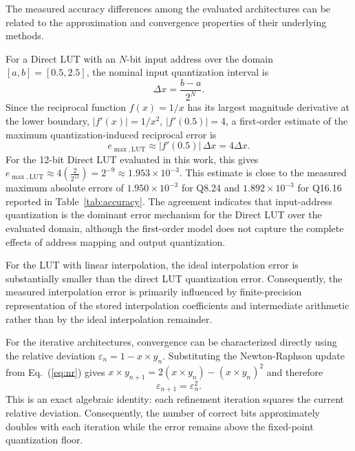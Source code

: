 \documentclass[manuscript,screen,review]{acmart}
\begin{document}
The measured accuracy differences among the evaluated architectures can be related to the approximation and convergence properties of their underlying methods.

For a Direct LUT with an $N$-bit input address over the domain $[a,b] = [0.5, 2.5]$, the nominal input quantization interval is
\begin{equation}
\Delta x = \frac{b - a}{2^N}.
\label{eq:deltax}
\end{equation}
Since the reciprocal function $f(x) = 1/x$ has its largest magnitude derivative at the lower boundary, $|f'(x)| = 1/x^2$, $|f'(0.5)| = 4$, a first-order estimate of the maximum quantization-induced reciprocal error is
\begin{equation}
e_{\max,\text{LUT}} \approx |f'(0.5)|\, \Delta x = 4 \Delta x.
\label{eq:elut}
\end{equation}
For the 12-bit Direct LUT evaluated in this work, this gives $e_{\max,\text{LUT}} \approx 4\left(\frac{2}{2^{12}}\right) = 2^{-9} \approx 1.953 \times 10^{-3}$. This estimate is close to the measured maximum absolute errors of $1.950 \times 10^{-3}$ for Q8.24 and $1.892 \times 10^{-3}$ for Q16.16 reported in Table~\ref{tab:accuracy}. The agreement indicates that input-address quantization is the dominant error mechanism for the Direct LUT over the evaluated domain, although the first-order model does not capture the complete effects of address mapping and output quantization.

For the LUT with linear interpolation, the ideal interpolation error is substantially smaller than the direct LUT quantization error. Consequently, the measured interpolation error is primarily influenced by finite-precision representation of the stored interpolation coefficients and intermediate arithmetic rather than by the ideal interpolation remainder.

For the iterative architectures, convergence can be characterized directly using the relative deviation $\varepsilon_n = 1 - x \times y_n$. Substituting the Newton-Raphson update from Eq.~(\ref{eq:nr}) gives $x \times y_{n+1} = 2(x \times y_n) - (x \times y_n)^2$ and therefore
\begin{equation}
\varepsilon_{n+1} = \varepsilon_n^2.
\label{eq:quadconv}
\end{equation}
This is an exact algebraic identity: each refinement iteration squares the current relative deviation. Consequently, the number of correct bits approximately doubles with each iteration while the error remains above the fixed-point quantization floor.
\end{document}
